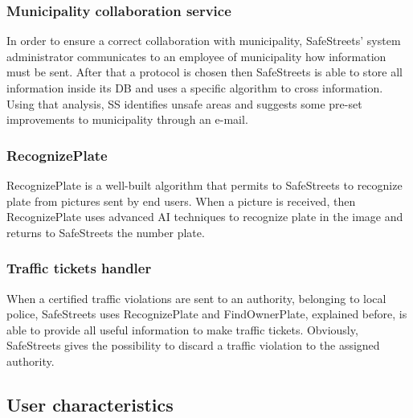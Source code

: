 \documentclass[12pt]{article}
\begin{document}
\subsubsection{Municipality collaboration service }
\vspace{2mm}
In order to ensure a correct collaboration with municipality, SafeStreets’ system administrator communicates to an employee of municipality how information must be sent. After that a protocol is chosen then SafeStreets is able to store all information inside its DB and uses a specific algorithm to cross information. Using that analysis, SS identifies unsafe areas and suggests some pre-set improvements to municipality through an e-mail. 

\subsubsection{RecognizePlate}
\vspace{2mm}
RecognizePlate is a well-built algorithm that permits to SafeStreets to recognize plate from pictures sent by end users. When a picture is received, then RecognizePlate uses advanced AI techniques to recognize plate in the image and returns to SafeStreets the number plate. 
 
\subsubsection{Traffic tickets handler}
\vspace{2mm}
When a certified traffic violations are sent to an authority, belonging to local police, SafeStreets uses RecognizePlate and FindOwnerPlate, explained before, is able to provide all useful information to make traffic tickets. Obviously, SafeStreets gives the possibility to discard a traffic violation to the assigned authority.
\subsection{User characteristics}
\vspace{5mm}
\end{document}
